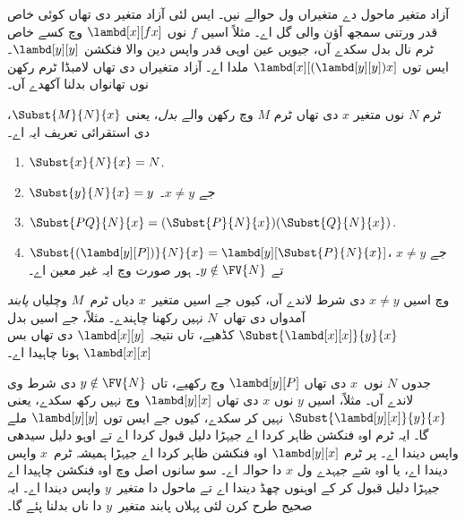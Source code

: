\documentclass[../../../include/open-logic-section]{subfiles}
\begin{document}

\begin{explain}
آزاد متغیر ماحول دے متغیراں ول حوالے نیں۔ ایس لئی آزاد متغیر
دی تھاں کوئی خاص قدر ورتنی سمجھ آؤن والی گل اے۔ مثلاً اسیں
$f$ نوں $\lambd[x][f x]$ وچ کسے خاص ٹرم نال بدل سکدے آں،
جیویں عین اوہی قدر واپس دین والا فنکشن $\lambd[y][y]$۔
ایس توں $\lambd[x][(\lambd[y][y]) x]$ ملدا اے۔ آزاد
متغیراں دی تھاں لامبڈا ٹرم رکھن نوں تھانواں بدلنا آکھدے آں۔
\end{explain}

\begin{defn} 
  ٹرم $N$ نوں متغیر $x$ دی تھاں ٹرم $M$ وچ رکھن والے \emph{بدل}، یعنی
  $\Subst{M}{N}{x}$، دی استقرائی تعریف ایہ اے۔
  \begin{enumerate}
    \item $\Subst{x}{N}{x} = N$. 
    \item $\Subst{y}{N}{x}  = y$ جے $x \neq y$۔ 
    \item $\Subst{PQ}{N}{x}  = (\Subst{P}{N}{x}) (\Subst{Q}{N}{x})$.
    \item $\Subst{(\lambd[y][P])}{N}{x} = \lambd[y][\Subst{P}{N}{x}]$،
      جے $x \neq y$ تے $y \notin \FV{N}$۔ ہور صورت وچ ایہ غیر معین اے۔
  \end{enumerate}
\end{defn}

\begin{explain}
 وچ اسیں
$x
\neq y$ دی شرط لاندے آں، کیوں جے اسیں متغیر~$x$ دیاں
ٹرم~$M$ وچلیاں \emph{پابند} آمدواں دی تھاں~$N$ نہیں رکھنا چاہندے۔
مثلاً، جے اسیں بدل $\Subst{\lambd[x][x]}{y}{x}$ کڈھیے، تاں
نتیجہ $\lambd[x][y]$ دی تھاں بس $\lambd[x][x]$ ہونا چاہیدا اے۔

جدوں $N$ نوں~$x$ دی تھاں $\lambd[y][P]$ وچ رکھیے، تاں
$y \notin \FV{N}$ دی شرط وی لاندے آں۔ مثلاً، اسیں $y$
نوں $x$ دی تھاں $\lambd[y][x]$ وچ نہیں رکھ سکدے، یعنی
$\Subst{\lambd[y][x]}{y}{x}$ نہیں کر سکدے، کیوں جے ایس
توں $\lambd[y][y]$ ملے گا۔ ایہ ٹرم اوہ فنکشن ظاہر کردا اے
جیہڑا دلیل قبول کردا اے تے اوہو دلیل سیدھی واپس دیندا اے۔
پر ٹرم $\lambd[y][x]$ اوہ فنکشن ظاہر کردا اے جیہڑا ہمیشہ
ٹرم~$x$ واپس دیندا اے، یا اوہ شے جیہدے ول $x$ دا حوالہ اے۔
سو سانوں اصل وچ اوہ فنکشن چاہیدا اے جیہڑا دلیل قبول کر کے
اوہنوں چھڈ دیندا اے تے ماحول دا متغیر~$y$ واپس دیندا اے۔
ایہ صحیح طرح کرن لئی پہلاں پابند متغیر~$y$ دا ناں بدلنا پئے گا۔
\end{explain}
\end{document}
